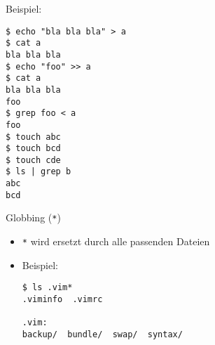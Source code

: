     \begin{frame}[fragile]
      Beispiel:
\begin{verbatim}
$ echo "bla bla bla" > a
$ cat a
bla bla bla
$ echo "foo" >> a
$ cat a
bla bla bla
foo
$ grep foo < a
foo
$ touch abc
$ touch bcd
$ touch cde
$ ls | grep b
abc
bcd
\end{verbatim}
\end{frame}

    \begin{frame}[fragile]{Globbing (\texttt{*})}
      \begin{itemize}
        \item \texttt{*} wird ersetzt durch alle passenden Dateien
        \item Beispiel:
\begin{verbatim}
$ ls .vim*
.viminfo  .vimrc

.vim:
backup/  bundle/  swap/  syntax/
\end{verbatim}
      \end{itemize}
\end{frame}
